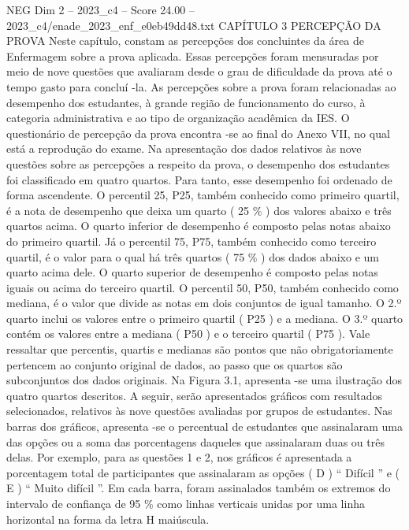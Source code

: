 \begin{textsample}{NEG Dim 2 – 2023\_c4 – Score 24.00 – 2023\_c4/enade\_2023\_enf\_e0eb49dd48.txt}  \label{ex:f2_neg_424}
CAPÍTULO 3 PERCEPÇÃO DA PROVA Neste capítulo, constam as percepções dos concluintes da área de Enfermagem sobre a prova aplicada.
Essas percepções foram mensuradas por meio de nove questões que avaliaram desde o grau de dificuldade da prova até o tempo gasto para concluí -la.
As percepções sobre a prova foram relacionadas ao desempenho dos estudantes, à grande região de funcionamento do curso, à categoria administrativa e ao tipo de organização acadêmica da IES.
O questionário de percepção da prova encontra -se ao final do Anexo VII, no qual está a reprodução do exame.
Na apresentação dos dados relativos às nove questões sobre as percepções a respeito da prova, o desempenho dos estudantes foi classificado em quatro quartos.
Para tanto, esse desempenho foi ordenado de forma ascendente.
O percentil 25, P25, também conhecido como primeiro quartil, é a nota de desempenho que deixa um quarto ( 25 \% ) dos valores abaixo e três quartos acima.
O quarto inferior de desempenho é composto pelas notas abaixo do primeiro quartil.
Já o percentil 75, P75, também conhecido como terceiro quartil, é o valor para o qual há três quartos ( 75 \% ) dos dados abaixo e um quarto acima dele.
O quarto superior de desempenho é composto pelas notas iguais ou acima do terceiro quartil.
O percentil 50, P50, também conhecido como mediana, é o valor que divide as notas em dois conjuntos de igual tamanho.
O 2.º quarto inclui os valores entre o primeiro quartil ( P25 ) e a mediana.
O 3.º quarto contém os valores entre a mediana ( P50 ) e o terceiro quartil ( P75 ).
Vale ressaltar que percentis, quartis e medianas são pontos que não obrigatoriamente pertencem ao conjunto original de dados, ao passo que os quartos são subconjuntos dos dados originais.
Na Figura 3.1, apresenta -se uma ilustração dos quatro quartos descritos.
A seguir, serão apresentados gráficos com resultados selecionados, relativos às nove questões avaliadas por grupos de estudantes.
Nas barras dos gráficos, apresenta -se o percentual de estudantes que assinalaram uma das opções ou a soma das porcentagens daqueles que assinalaram duas ou três delas.
Por exemplo, para as questões 1 e 2, nos gráficos é apresentada a porcentagem total de participantes que assinalaram as opções ( D ) “ Difícil ” e ( E ) “ Muito difícil ”.
Em cada barra, foram assinalados também os extremos do intervalo de confiança de 95 \% como linhas verticais unidas por uma linha horizontal na forma da letra H maiúscula.

\end{textsample}

